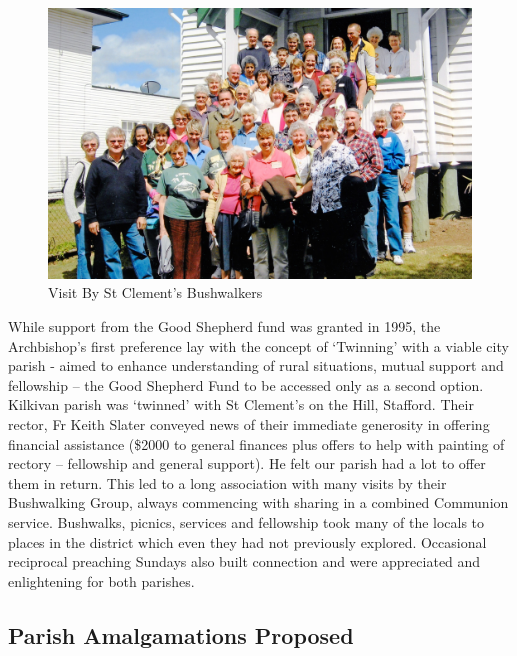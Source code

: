 \begin{figure}[!htb]
\begin{center}
\includegraphics[width=1.\textwidth,center]{../images/visitByStClementsBushwalkers.jpg}
\caption{Visit By St Clement's Bushwalkers}
\end{center}
\end{figure}




While support from the Good Shepherd fund was granted in 1995, the Archbishop's first preference lay with the concept of `Twinning' with a viable city parish - aimed to enhance understanding of rural situations, mutual support and fellowship -- the Good Shepherd Fund to be accessed only as a second option. Kilkivan parish was `twinned' with St Clement's on the Hill, Stafford. Their rector, Fr Keith Slater conveyed news of their immediate generosity in offering financial assistance (\$2000 to general finances plus offers to help with painting of rectory -- fellowship and general support). He felt our parish had a lot to offer them in return. This led to a long association with many visits by their Bushwalking Group, always commencing with sharing in a combined Communion service. Bushwalks, picnics, services and fellowship took many of the locals to places in the district which even they had not previously explored. Occasional reciprocal preaching Sundays also built connection and were appreciated and enlightening for both parishes.



\subsection{Parish Amalgamations Proposed}



